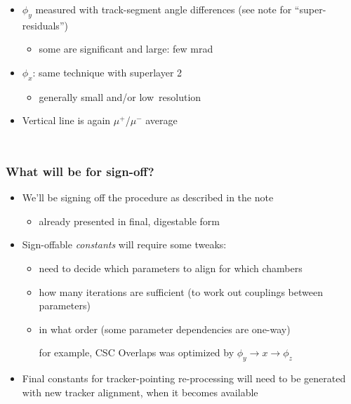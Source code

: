 \documentclass[compress]{beamer}
\begin{document}
\begin{frame}
\begin{columns}
\begin{itemize}\setlength{\itemsep}{0.25 cm}
\item $\phi_y$ measured with track-segment angle differences (see note for ``super-residuals'')
\begin{itemize}
\item some are significant and large: few mrad
\end{itemize}

\item $\phi_x$: same technique with superlayer 2
\begin{itemize}
\item generally small and/or \mbox{low resolution\hspace{-1 cm}}
\end{itemize}

\item Vertical line is again $\mu^+$/$\mu^-$ average

\end{itemize}
\end{columns}
\end{frame}

\begin{frame}
\frametitle{What will be for sign-off?}
\begin{itemize}\setlength{\itemsep}{0.3 cm}
\item We'll be signing off the procedure as described in the note
\begin{itemize}
\item already presented in final, digestable form
\end{itemize}
\item Sign-offable {\it constants} will require some tweaks:
\begin{itemize}\setlength{\itemsep}{0.15 cm}
\item need to decide which parameters to align for which chambers
\item how many iterations are sufficient (to work out couplings between parameters)
\item in what order (some parameter dependencies are one-way)

for example, CSC Overlaps was optimized by $\phi_y \to x \to \phi_z$
\end{itemize}
\item Final constants for tracker-pointing re-processing will need to
  be generated with new tracker alignment, when it becomes available
\end{itemize}
\end{frame}
\end{document}
